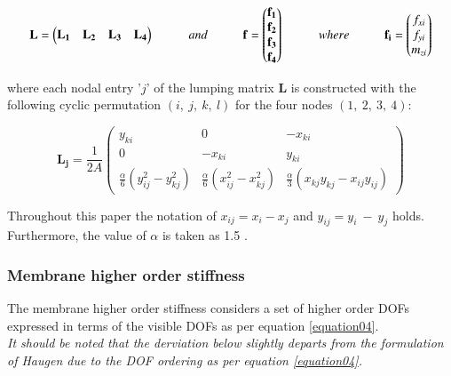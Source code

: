 \begin{equation} 
\mathbf{L} =
\begin{pmatrix}
\mathbf{L_1} & \mathbf{L_2} & \mathbf{L_3} & \mathbf{L_4}
\end{pmatrix}
\hspace{10mm}
and
\hspace{10mm}
\mathbf{f} =
\begin{pmatrix}
\mathbf{f_1} \\
\mathbf{f_2} \\
\mathbf{f_3} \\
\mathbf{f_4}
\end{pmatrix}
\hspace{10mm}
where
\hspace{10mm}
\mathbf{f_i} =
\begin{pmatrix}
{f_{xi}} \\
{f_{yi}} \\
{m_{zi}}
\end{pmatrix}
\label{equation06}
\end{equation}

where each nodal entry '$j$' of the lumping matrix $\textbf{L}$ is constructed with the following cyclic permutation $(i,\ j,\ k,\ l)$ for the four nodes $(1,\ 2,\ 3,\ 4)$:

\begin{equation} 
\mathbf{L_j} = \frac{1}{2 A}
\begin{pmatrix}
y_{ki} & 0 & -x_{ki} \\
0 & -x_{ki} & y_{ki} \\
\frac{\alpha}{6}(y_{ij}^2 - y_{kj}^2 ) & \frac{\alpha}{6}(x_{ij}^2 - x_{kj}^2 ) & \frac{\alpha}{3}(x_{kj}y_{kj} - x_{ij}y_{ij})
\end{pmatrix}
\label{equation07}
\end{equation}

Throughout this paper the notation of $x_{ij} = x_i - x_j$ and $y_{ij} = y_i\ -\ y_j$ holds. Furthermore, the value of $\alpha$ is taken as 1.5 \cite{Fel91}.

\subsubsection{Membrane higher order stiffness}

The membrane higher order stiffness considers a set of higher order DOFs expressed in terms of the visible DOFs as per equation \eqref{equation04}.\\

\textit{It should be noted that the derviation below slightly departs from the formulation of Haugen \cite{Hau94} due to the DOF ordering as per equation \eqref{equation04}.}\\

